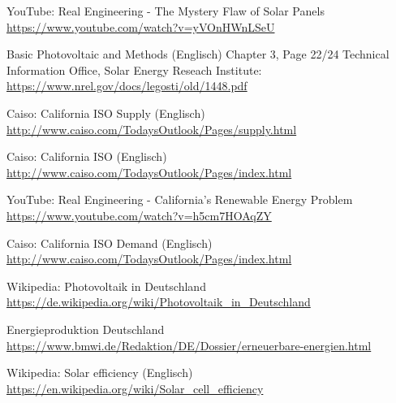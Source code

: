 \begin{thebibliography}{99}
    YouTube: Real Engineering - The Mystery Flaw of Solar Panels\\
    \href{https://www.youtube.com/watch?v=yVOnHWnLSeU}{
        https://www.youtube.com/watch?v=yVOnHWnLSeU
    }

    Basic Photovoltaic and Methods (Englisch) Chapter 3, Page 22/24
    Technical Information Office, Solar Energy Reseach Institute:
    \href{https://www.nrel.gov/docs/legosti/old/1448.pdf}{
        https://www.nrel.gov/docs/legosti/old/1448.pdf
    }

    Caiso: California ISO Supply (Englisch)\\
    \href{http://www.caiso.com/TodaysOutlook/Pages/supply.html}{
        http://www.caiso.com/TodaysOutlook/Pages/supply.html
    }

    Caiso: California ISO (Englisch)\\
    \href{http://www.caiso.com/TodaysOutlook/Pages/index.html}{
        http://www.caiso.com/TodaysOutlook/Pages/index.html
    }

    YouTube: Real Engineering - California's Renewable Energy Problem\\
    \href{https://www.youtube.com/watch?v=h5cm7HOAqZY}{
        https://www.youtube.com/watch?v=h5cm7HOAqZY
    }

    Caiso: California ISO Demand (Englisch)\\
    \href{http://www.caiso.com/TodaysOutlook/Pages/index.html}{
        http://www.caiso.com/TodaysOutlook/Pages/index.html
    }

    Wikipedia: Photovoltaik in Deutschland\\
    \href{https://de.wikipedia.org/wiki/Photovoltaik_in_Deutschland}{
        https://de.wikipedia.org/wiki/Photovoltaik\_in\_Deutschland
    }

    Energieproduktion Deutschland\\
    \href{https://www.bmwi.de/Redaktion/DE/Dossier/erneuerbare-energien.html}{
        https://www.bmwi.de/Redaktion/DE/Dossier/erneuerbare-energien.html
    }

    Wikipedia: Solar efficiency (Englisch)\\
    \href{https://en.wikipedia.org/wiki/Solar_cell_efficiency}{
        https://en.wikipedia.org/wiki/Solar\_cell\_efficiency
    }


\end{thebibliography}

